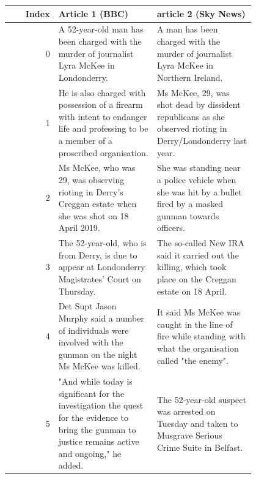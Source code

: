 \begin{table}[!htbp]
        \centering
        \begin{tabular}{r | p{0.4\linewidth} | p{0.4\linewidth} }
        Index & Article 1 (BBC) & article 2 (Sky News) \\
        \hline
        0\vspace{-2px} & \tiny{A 52-year-old man has been charged with the murder of journalist Lyra McKee in Londonderry.}\vspace{-2px} & \tiny{A man has been charged with the murder of journalist Lyra McKee in Northern Ireland.}\vspace{-2px}\\
        1\vspace{-2px} & \tiny{He is also charged with possession of a firearm with intent to endanger life and professing to be a member of a proscribed organisation.}\vspace{-2px} & \tiny{Ms McKee, 29, was shot dead by dissident republicans as she observed rioting in Derry/Londonderry last year.}\vspace{-2px}\\
        2\vspace{-2px} & \tiny{Ms McKee, who was 29, was observing rioting in Derry's Creggan estate when she was shot on 18 April 2019. }\vspace{-2px}& \tiny{She was standing near a police vehicle when she was hit by a bullet fired by a masked gunman towards officers.}\vspace{-2px}\\
        3\vspace{-2px} & \tiny{The 52-year-old, who is from Derry, is due to appear at Londonderry Magistrates' Court on Thursday.}\vspace{-2px} & \tiny{The so-called New IRA said it carried out the killing, which took place on the Creggan estate on 18 April.}\vspace{-2px}\\
        4\vspace{-2px} & \tiny{Det Supt Jason Murphy said a number of individuals were involved with the gunman on the night Ms McKee was killed.}\vspace{-2px} & \tiny{It said Ms McKee was caught in the line of fire while standing with what the organisation called "the enemy".}\vspace{-2px}\\
        5\vspace{-2px} & \tiny{"And while today is significant for the investigation the quest for the evidence to bring the gunman to justice remains active and ongoing," he added.}\vspace{-2px} & \tiny{The 52-year-old suspect was arrested on Tuesday and taken to Musgrave Serious Crime Suite in Belfast.}\vspace{-2px}\\

\end{tabular}
\end{table}
